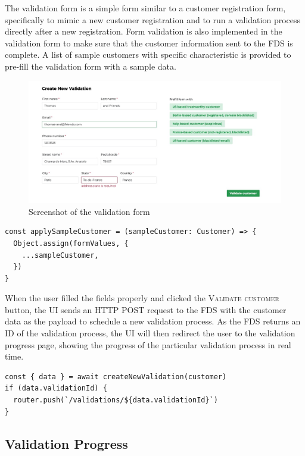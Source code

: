     The validation form is a simple form similar to a customer registration form, specifically to mimic a new customer registration and to run a validation process directly after a new registration. Form validation is also implemented in the validation form to make sure that the customer information sent to the FDS is complete. A list of sample customers with specific characteristic is provided to pre-fill the validation form with a sample data. 

    \begin{figure}[!ht]
      \includegraphics[width=\textwidth]{images/ss_customer_form.jpeg}
      \caption{Screenshot of the validation form}
    \end{figure}

    \newpage
    \begin{lstlisting}[style=es6, caption={Prefilling form values with a sample customer data (TypeScript)}]
const applySampleCustomer = (sampleCustomer: Customer) => {
  Object.assign(formValues, {
    ...sampleCustomer,
  })
}
    \end{lstlisting}

    When the user filled the fields properly and clicked the \textsc{Validate customer} button, the UI sends an HTTP POST request to the FDS with the customer data as the payload to schedule a new validation process. As the FDS returns an ID of the validation process, the UI will then redirect the user to the validation progress page, showing the progress of the particular validation process in real time. 

    \begin{lstlisting}[style=es6, caption={ (TypeScript)}]
const { data } = await createNewValidation(customer)
if (data.validationId) {
  router.push(`/validations/${data.validationId}`)
}
    \end{lstlisting}

  \subsection{Validation Progress}
  
